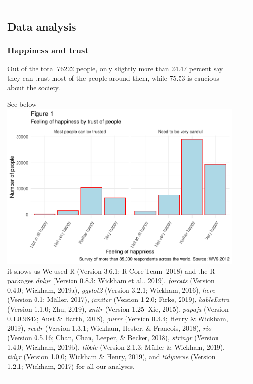 \documentclass[man, fleqn, noextraspace,floatsintext]{apa6}
\begin{document}
\begin{tabular}{l|l|r}
\hypertarget{data-analysis}{%
\subsection{Data analysis}\label{data-analysis}}

\hypertarget{happiness-and-trust}{%
\subsubsection{Happiness and trust}\label{happiness-and-trust}}

Out of the total 76222 people, only slightly more than 24.47 percent say they can trust most of the people around them, while 75.53 is caucious about the society.

See below
\includegraphics{610_final_files/figure-latex/unnamed-chunk-1-1.pdf}
it shows us
We used R (Version 3.6.1; R Core Team, 2018) and the R-packages \emph{dplyr} (Version 0.8.3; Wickham et al., 2019), \emph{forcats} (Version 0.4.0; Wickham, 2019a), \emph{ggplot2} (Version 3.2.1; Wickham, 2016), \emph{here} (Version 0.1; Müller, 2017), \emph{janitor} (Version 1.2.0; Firke, 2019), \emph{kableExtra} (Version 1.1.0; Zhu, 2019), \emph{knitr} (Version 1.25; Xie, 2015), \emph{papaja} (Version 0.1.0.9842; Aust \& Barth, 2018), \emph{purrr} (Version 0.3.3; Henry \& Wickham, 2019), \emph{readr} (Version 1.3.1; Wickham, Hester, \& Francois, 2018), \emph{rio} (Version 0.5.16; Chan, Chan, Leeper, \& Becker, 2018), \emph{stringr} (Version 1.4.0; Wickham, 2019b), \emph{tibble} (Version 2.1.3; Müller \& Wickham, 2019), \emph{tidyr} (Version 1.0.0; Wickham \& Henry, 2019), and \emph{tidyverse} (Version 1.2.1; Wickham, 2017) for all our analyses.


\end{tabular}
\end{document}
